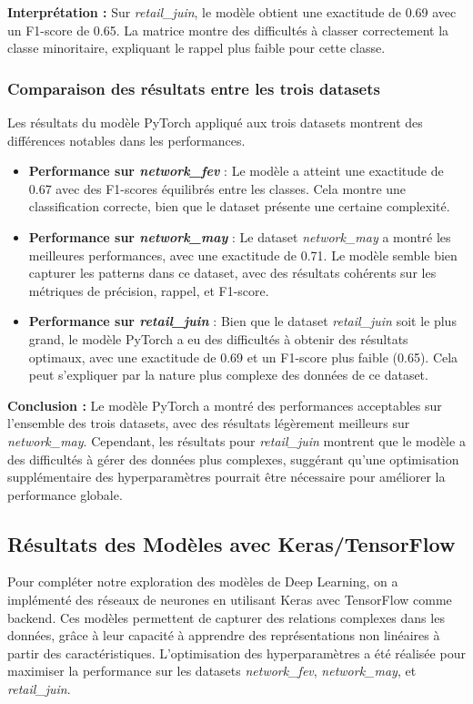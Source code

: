 \textbf{Interprétation :} Sur \textit{retail\_juin}, le modèle obtient une exactitude de 0.69 avec un F1-score de 0.65. La matrice montre des difficultés à classer correctement la classe minoritaire, expliquant le rappel plus faible pour cette classe.

\subsubsection{Comparaison des résultats entre les trois datasets}

Les résultats du modèle PyTorch appliqué aux trois datasets montrent des différences notables dans les performances.

\begin{itemize}
    \item \textbf{Performance sur \textit{network\_fev}} : Le modèle a atteint une exactitude de 0.67 avec des F1-scores équilibrés entre les classes. Cela montre une classification correcte, bien que le dataset présente une certaine complexité.
    \item \textbf{Performance sur \textit{network\_may}} : Le dataset \textit{network\_may} a montré les meilleures performances, avec une exactitude de 0.71. Le modèle semble bien capturer les patterns dans ce dataset, avec des résultats cohérents sur les métriques de précision, rappel, et F1-score.
    \item \textbf{Performance sur \textit{retail\_juin}} : Bien que le dataset \textit{retail\_juin} soit le plus grand, le modèle PyTorch a eu des difficultés à obtenir des résultats optimaux, avec une exactitude de 0.69 et un F1-score plus faible (0.65). Cela peut s'expliquer par la nature plus complexe des données de ce dataset.
\end{itemize}

\textbf{Conclusion :} Le modèle PyTorch a montré des performances acceptables sur l'ensemble des trois datasets, avec des résultats légèrement meilleurs sur \textit{network\_may}. Cependant, les résultats pour \textit{retail\_juin} montrent que le modèle a des difficultés à gérer des données plus complexes, suggérant qu'une optimisation supplémentaire des hyperparamètres pourrait être nécessaire pour améliorer la performance globale.
\subsection{Résultats des Modèles avec Keras/TensorFlow}

Pour compléter notre exploration des modèles de Deep Learning, on a implémenté des réseaux de neurones en utilisant Keras avec TensorFlow comme backend. Ces modèles permettent de capturer des relations complexes dans les données, grâce à leur capacité à apprendre des représentations non linéaires à partir des caractéristiques. L'optimisation des hyperparamètres a été réalisée pour maximiser la performance sur les datasets \textit{network\_fev}, \textit{network\_may}, et \textit{retail\_juin}.

